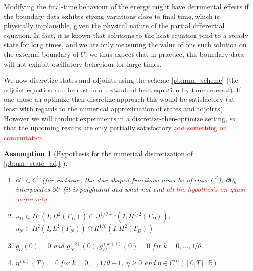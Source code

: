 \documentclass[english,a4paper,10pt,oneside]{scrbook}	%
\theoremstyle{break}
\newtheorem{ass}[equation]{Assumption}
\theoremstyle{remark}
\newcommand{\mR}{\mathbb{R}}
\begin{document}
Modifying the final-time behaviour of the energy might have detrimental effects if the boundary data exhibts strong variations close to final time, which is physically implausible, given the physical nature of the partial differential equation. In fact, it is known that solutions to the heat equation tend to a steady state for long times, and we are only measuring the value of one such solution on the external boundary of $U$: we thus expect that in practice, this boundary data will not exhibit oscillatory behaviour for large times.

We now discretize states and adjoints using the scheme \cref{pb:num_scheme} (the adjoint equation can be cast into a standard heat equation by time reversal). If one chose an optimize-then-discretize approach this would be satisfactory (at least with regards to the numerical approximation of states and adjoints). However we will conduct experiments in a discretize-then-optimize setting, so that the upcoming results are only partially satisfactory \textcolor{red}{add something on commutation}.

\begin{ass}[Hypothesis for the numerical discretization of \cref{pb:uni_state_adj} ]
\label{ass:num_discr_shopt}
\textcolor{white}{ }
\begin{enumerate}
	\item $\partial U \in C^2$ (for instance, the star shaped functions must be of class $C^2$), $\partial U_h$ interpolates $\partial U$ (it is polyhedral and what not and \textcolor{red}{all the hypothesis on quasi uniformity}
	\item $u_D \in H^1(I, H^{2}(\Gamma_D)) \cap H^{1/\theta+1}(I,H^{3/2}(\Gamma_D))$, $u_N \in H^2(I,L^2(\Gamma_N)) \cap H^{1/\theta}(I, H^2(\Gamma_D))$
	\item $g_D(0)=0$ and $g_N^{(k)}(0), g_D^{(k+1)}(0)  = 0$ for $k=0,..., 1/\theta$
	\item $\eta^{(k)}(T)  = 0$ for $k=0,..., 1/\theta-1$, $\eta \geq 0$ and $\eta \in C^{\infty}([0,T];\mR)$
\end{enumerate}

\end{ass}
\end{document}
